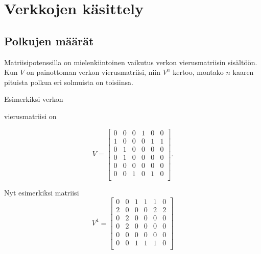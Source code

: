 \section{Verkkojen käsittely}

\subsection{Polkujen määrät}

Matriisipotenssilla
on mielenkiintoinen vaikutus
verkon vierusmatriisin sisältöön.
Kun $V$ on painottoman verkon vierusmatriisi,
niin $V^n$ kertoo,
montako $n$ kaaren pituista polkua
eri solmuista on toisiinsa.

Esimerkiksi verkon
\begin{center}
\end{center}

vierusmatriisi on

\[
V= \begin{bmatrix}
  0 & 0 & 0 & 1 & 0 & 0 \\
  1 & 0 & 0 & 0 & 1 & 1 \\
  0 & 1 & 0 & 0 & 0 & 0 \\
  0 & 1 & 0 & 0 & 0 & 0 \\
  0 & 0 & 0 & 0 & 0 & 0 \\
  0 & 0 & 1 & 0 & 1 & 0 \\
 \end{bmatrix}.
\]

Nyt esimerkiksi matriisi
\[
V^4= \begin{bmatrix}
  0 & 0 & 1 & 1 & 1 & 0 \\
  2 & 0 & 0 & 0 & 2 & 2 \\
  0 & 2 & 0 & 0 & 0 & 0 \\
  0 & 2 & 0 & 0 & 0 & 0 \\
  0 & 0 & 0 & 0 & 0 & 0 \\
  0 & 0 & 1 & 1 & 1 & 0 \\
 \end{bmatrix}
\]

